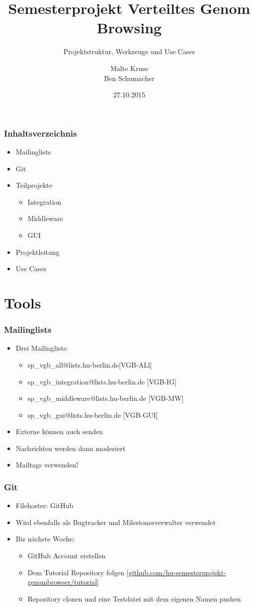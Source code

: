 \documentclass{beamer}
\title[VGB]{Semesterprojekt Verteiltes Genom Browsing}
\subtitle{Projektstruktur, Werkzeuge und Use Cases}
\author[Kruse,Schumacher]{Malte Kruse\\Ben Schumacher}
\institute{Institut für Informatik\\Humboldt-Universität zu Berlin}
\date{27.10.2015}
\begin{document}
\begin{frame}
	\titlepage
\end{frame}


\begin{frame}
	\frametitle{Inhaltsverzeichnis}
	\begin{itemize}
		\item Mailinglists
		\item Git
		\item Teilprojekte
			\begin{itemize}
				\item Integration
				\item Middleware
				\item GUI
			\end{itemize}
		\item Projektleitung
		\item Use Cases
	\end{itemize}
\end{frame}

\section{Tools}
\begin{frame}
	\frametitle{Mailinglists}
	\begin{itemize}
		\item Drei Mailinglists:
		\begin{itemize}
			\item sp\_vgb\_all@lists.hu-berlin.de[VGB-ALl]
			\item sp\_vgb\_integration@lists.hu-berlin.de [VGB-IG]
			\item sp\_vgb\_middleware@lists.hu-berlin.de [VGB-MW]
			\item sp\_vgb\_gui@lists.hu-berlin.de [VGB-GUI]
		\end{itemize}
		\item Externe können auch senden\\
	\item Nachrichten werden dann moderiert
	\item Mailtags verwenden!
	\end{itemize}
\end{frame}

\begin{frame}
	\frametitle{Git}
	\begin{itemize}
		\item Filehoster: GitHub
		\item Wird ebenfalls als Bugtracker und Milestonesverwalter verwendet
		\item Bis nächste Woche:
		\begin{itemize}
			\item GitHub Account erstellen
			\item Dem Tutorial Repository folgen
			[\url{github.com/hu-semesterprojekt-genombrowser/tutorial}]
			\item Repository clonen und eine Testdatei mit dem eigenen Namen pushen
		\end{itemize}
	\end{itemize}
\end{frame}
\end{document}
